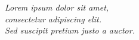 \vspace*{20em}

\begin{centering}
\emph{Lorem ipsum dolor sit amet,} \\
\emph{consectetur adipiscing elit.} \\
\emph{Sed suscipit pretium justo a auctor.} \\
\end{centering}

\cleardoublepage
